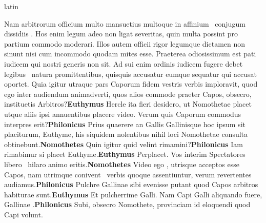 \documentclass[12pt]{book}
\renewenvironment{latin}
    	{\begin{hyphenrules}{latin}}
    	{\end{hyphenrules}}
\begin{document}
\begin{pages}
\begin{latin}
\begin{Leftside}
                    Nam arbitrorum officium multo mansuetius multoque in affinium ﻿\ampersand\ conjugum dissidiis . 
                    Hos enim legum adeo non ligat severitas, quin multa possint pro partium commodo  moderari. 
                    Illos autem officii rigor legumque dictamen non sinunt nisi cum incommodo quodam mites esse. 
                    Praeterea odiosissimum est pati iudicem qui nostri generis non sit. 
                    Ad sui enim ordinis iudicem fugere debet legibus ﻿\ampersand\ natura promittentibus, 
                    quisquis accusatur eumque sequatur qui accusat oportet. 
                    Quia igitur utraque pars Caporum fidem vestris verbis imploravit, 
                    quod ego  inter audiendum animadverti, 
                    quos alios commode praeter Capos, obsecro, instituetis Arbitros?\pend\pstart\textbf{Euthymus }\hspace{1cm} Hercle ita fieri desidero, ut Nomothetae placet utque aliis ipsi annuentibus placere video. 
                    Verum quis Caporum commodus interpres erit?\pend\pstart\textbf{Philonicus }\hspace{1cm} Prius quaerere an Gallis Gallinisque hoc ipsum sit placiturum, Euthyme, 
                    his siquidem nolentibus nihil loci Nomothetae consulta obtinebunt.\pend\pstart\textbf{Nomothetes }\hspace{1cm} Quin igitur quid velint rimamini?\pend\pstart\textbf{Philonicus }\hspace{1cm} Iam rimabimur si placet Euthyme.\pend\pstart\textbf{Euthymus }\hspace{1cm} Perplacet. 
                    Vos interim Spectatores libero ﻿\ampersand\ hilaro animo eritis.\pend\pstart\textbf{Nomothetes }\hspace{1cm} Video ego , utrisque acceptos esse Capos, 
                    nam utrimque conivent ﻿\ampersand\ verbis quoque assentiuntur, verum revertentes audiamus.\pend\pstart\textbf{Philonicus }\hspace{1cm} Pulchre Gallinae sibi evenisse putant quod Capos arbitros habiturae sunt.\pend\pstart\textbf{Euthymus }\hspace{1cm} Et pulcherrime Galli. 
                    Nam Capi Galli aliquando fuere, Gallinae .\pend\pstart\textbf{Philonicus }\hspace{1cm} Subi, obsecro Nomothete, provinciam id eloquendi quod Capi volunt. 

\end{Leftside}
\end{latin}
\end{pages}
\end{document}
